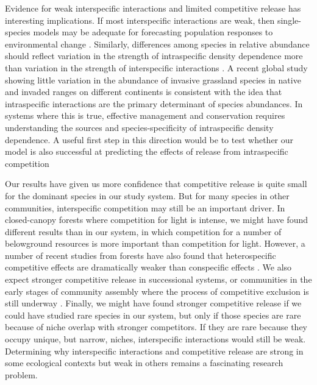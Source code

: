 \documentclass[11pt]{article}
\begin{document}
\begin{doublespacing}
Evidence for weak interspecific interactions and limited competitive release has interesting implications. If most interspecific interactions are weak, then single-species models may be adequate for forecasting population responses to environmental change \citep{adler_forecasting_2012,kleinhesselink_indirect_2015,Chu2016}. Similarly, differences among species in relative abundance should reflect variation in the strength of intraspecific density dependence more than variation in the strength of interspecific interactions \citep{yenni_strong_2012}. A recent global study showing little variation in the abundance of invasive grassland species in native and invaded ranges on different continents  \citep{firn_abundance_2011} is consistent with the idea that intraspecific interactions are the primary determinant of species abundances. In systems where this is true, effective management and conservation requires understanding the sources and species-specificity of intraspecific density dependence. A useful first step in this direction would be to test whether our model is also successful at predicting the effects of release from intraspecific competition

Our results have given us more confidence that competitive release is quite small for the dominant species in our study system. But for many species in other communities, interspecific competition may still be an important driver. In closed-canopy forests where competition for light is intense, we might have found different results than in our system, in which competition for a number of belowground resources is more important than competition for light. However, a number of recent studies from forests have also found that heterospecific competitive effects are dramatically weaker than conspecific effects \citep{comita_asymmetric_2010,Kunstler2016,johnson_conspecific_2012}.  We also expect stronger competitive release in successional systems, or communities in the early stages of community assembly where the process of competitive exclusion is still underway \citep{kokkoris_patterns_1999}. Finally, we might have found stronger competitive release if we could have studied rare species in our system, but only if those species are rare because of niche overlap with stronger competitors. If they are rare because they occupy unique, but narrow, niches, interspecific interactions would still be weak. Determining why interspecific interactions and competitive release are strong in some ecological contexts but weak in others remains a fascinating research problem. 


\end{doublespacing}
\end{document}
